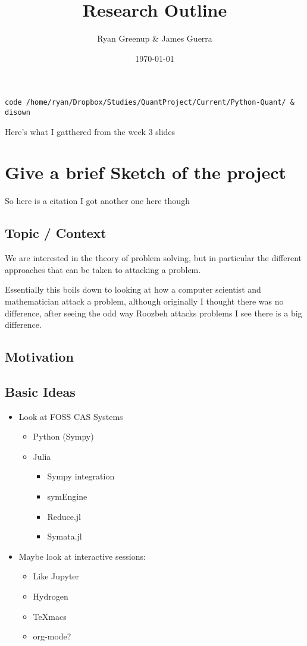 \documentclass[11pt]{article}
\author{Ryan Greenup \& James Guerra}
\date{\today}
\title{Research Outline}
\begin{document}
\maketitle
\tableofcontents

\begin{verbatim}
code /home/ryan/Dropbox/Studies/QuantProject/Current/Python-Quant/ & disown
\end{verbatim}

Here's what I gatthered from the week 3 slides

\section{Give a brief Sketch of the project}
\label{sec:org039101c}


So here is a citation \cite{lehmanReadingsMathematicsComputer2010}
I got another one here though \cite{nicodemiIntroductionAbstractAlgebra2007}
\subsection{Topic / Context}
\label{sec:orgc8ee0a5}
We are interested in the theory of problem solving, but in particular the
different approaches that can be taken to attacking a problem.

Essentially this boils down to looking at how a computer scientist and
mathematician attack a problem, although originally I thought there was no
difference, after seeing the odd way Roozbeh attacks problems I see there is a big difference.
\subsection{Motivation}
\label{sec:org9aff6e5}

\subsection{Basic Ideas}
\label{sec:orgfd2ddab}
\begin{itemize}
\item Look at FOSS CAS Systems
\begin{itemize}
\item Python (Sympy)
\item Julia
\begin{itemize}
\item Sympy integration
\item symEngine
\item Reduce.jl
\item Symata.jl
\end{itemize}
\end{itemize}

\item Maybe look at interactive sessions:
\begin{itemize}
\item Like Jupyter
\item Hydrogen
\item TeXmacs
\item org-mode?
\end{itemize}
\end{itemize}
\end{document}
